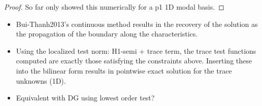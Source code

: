\begin{proof}
So far only showed this numerically for a p1 1D modal basis.
\end{proof}


\begin{itemize}
\item Bui-Thanh2013's continuous method results in the recovery of the solution as the propagation of the boundary along
the characteristics.
\item Using the localized test norm: H1-semi + trace term, the trace test functions computed are exactly those
satisfying the constraints above. Inserting these into the bilinear form results in pointwise exact solution for the
trace unknowns (1D).
\item Equivalent with DG using lowest order test?
\end{itemize}


